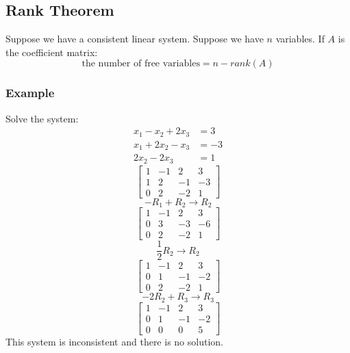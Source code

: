 \documentclass[letterpaper, 12pt]{math}
\begin{document}
\subsection*{Rank Theorem}
Suppose we have a consistent linear system. Suppose we have \( n \) variables.
If \( A \) is the coefficient matrix:
\[ \text{the number of free variables} = n-rank(A) \]

\subsubsection*{Example}
Solve the system:
\begin{align*}
  x_1-x_2+2x_3 &= 3 \\
  x_1+2x_2-x_3 &= -3 \\
  2x_2-2x_3 &= 1
\end{align*}
\[ \left[\begin{array}{ccc|c}
  1 & -1 & 2 & 3 \\
  1 & 2 & -1 & -3 \\
  0 & 2 & -2 & 1
\end{array}\right] \]
\[ -R_1+R_2 \to R_2 \]
\[ \left[\begin{array}{ccc|c}
  1 & -1 & 2 & 3 \\
  0 & 3 & -3 & -6 \\
  0 & 2 & -2 & 1
\end{array}\right] \]
\[ \frac{1}{2}R_2 \to R_2 \]
\[ \left[\begin{array}{ccc|c}
  1 & -1 & 2 & 3 \\
  0 & 1 & -1 & -2 \\
  0 & 2 & -2 & 1
\end{array}\right] \]
\[ -2R_2+R_3 \to R_3 \]
\[ \left[\begin{array}{ccc|c}
  1 & -1 & 2 & 3 \\
  0 & 1 & -1 & -2 \\
  0 & 0 & 0 & 5
\end{array}\right] \]
This system is inconsistent and there is no solution.
\end{document}
